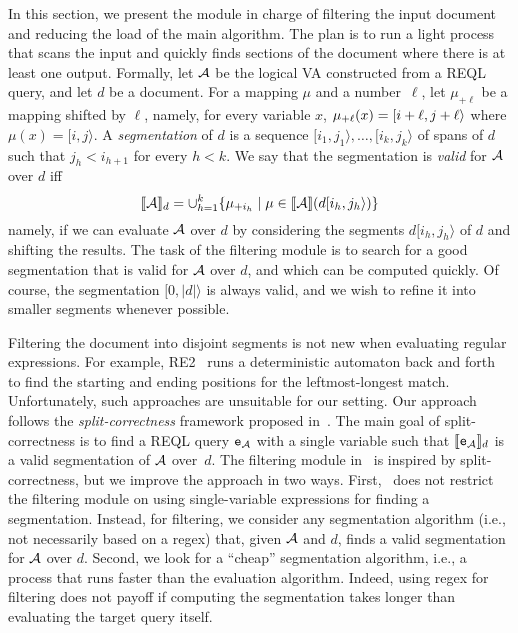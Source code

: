 
In this section, we present the module in charge of filtering the input document and reducing the load of the main algorithm. The plan is to run a light process that scans the input and quickly finds sections of the document where there is at least one output. Formally, let $\mathcal{A}$ be the logical VA constructed from a REQL query, and let $d$ be a document. For a mapping $\mu$ and a number~$\ell$, let $\mu_{+\ell}$ be a mapping shifted by $\ell$, namely, for every variable $x$, $\mu_{+\ell}(x) = [i+\ell, j+\ell\rangle$ where $\mu(x) = [i, j\rangle$. A \emph{segmentation} of $d$ is a sequence $[i_1, j_1\rangle, \ldots, [i_k, j_k\rangle$ of spans of $d$ such that $j_{h} < i_{h+1}$ for every $h < k$. We say that the segmentation is \emph{valid} for $\mathcal{A}$ over $d$ iff
$$
	\llbracket\mathcal{A}\rrbracket_{d} = \cup_{h=1}^k \{\mu_{+i_h} \mid \mu \in \llbracket\mathcal{A}\rrbracket(d[i_h, j_h\rangle) \}
$$
namely, if we can evaluate $\mathcal{A}$ over $d$ by considering the segments $d[i_h, j_h\rangle$ of $d$ and shifting the results. The task of the filtering module is to search for a good segmentation that is valid for $\mathcal{A}$ over $d$,
and which can be computed quickly.
Of course, the segmentation $[0, |d|\rangle$ is always valid, and we wish to refine it into smaller segments whenever possible.

Filtering the document into disjoint segments is not new when evaluating regular expressions. For example, RE2~\cite{cox2007regular} runs a deterministic automaton back and forth to find the starting and ending positions for the leftmost-longest match. Unfortunately, such approaches are unsuitable for our setting. Our approach follows the \emph{split-correctness} framework  proposed in~\cite{DoleschalKMNN19}. The main goal of split-correctness is to find a REQL query $\texttt{e}_{\mathcal{A}}$ with a single variable such that $\llbracket\texttt{e}_{\mathcal{A}}\rrbracket_{d}$ is a valid segmentation of $\mathcal{A}$ over~$d$.
The filtering module in \rematch\ is inspired by split-correctness, but we improve the approach in two ways. First, \rematch\ does not restrict the filtering module on using single-variable expressions for finding a segmentation. Instead, for filtering, we consider any segmentation algorithm (i.e., not necessarily based on a regex) that, given $\mathcal{A}$ and $d$, finds a valid segmentation for $\mathcal{A}$ over $d$. Second, we look for a ``cheap'' segmentation algorithm, i.e., a process that runs faster than the evaluation algorithm. Indeed, using regex for filtering does not payoff if computing the segmentation takes longer than evaluating the target query itself. %

